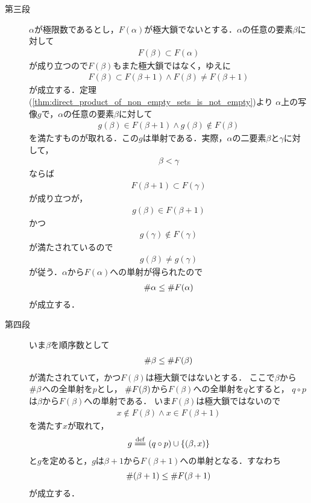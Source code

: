 \begin{sketch}
\begin{description}
			\item[第三段]
				$\alpha$が極限数であるとし，$F(\alpha)$が極大鎖でないとする．$\alpha$の任意の要素$\beta$に対して
				\begin{align}
					F(\beta) \subset F(\alpha)
				\end{align}
				が成り立つので$F(\beta)$もまた極大鎖ではなく，ゆえに
				\begin{align}
					F(\beta) \subset F(\beta + 1) \wedge F(\beta) \neq F(\beta + 1)
				\end{align}
				が成立する．定理(\ref{thm:direct_product_of_non_empty_sets_is_not_empty})より
				$\alpha$上の写像$g$で，$\alpha$の任意の要素$\beta$に対して
				\begin{align}
					g(\beta) \in F(\beta+1) \wedge g(\beta) \notin F(\beta)
				\end{align}
				を満たすものが取れる．この$g$は単射である．実際，$\alpha$の二要素$\beta$と$\gamma$に対して，
				\begin{align}
					\beta < \gamma
				\end{align}
				ならば
				\begin{align}
					F(\beta+1) \subset F(\gamma)
				\end{align}
				が成り立つが，
				\begin{align}
					g(\beta) \in F(\beta + 1)
				\end{align}
				かつ
				\begin{align}
					g(\gamma) \notin F(\gamma)
				\end{align}
				が満たされているので
				\begin{align}
					g(\beta) \neq g(\gamma)
				\end{align}
				が従う．$\alpha$から$F(\alpha)$への単射が得られたので
				\begin{align}
					\# \alpha \leq \# F(\alpha)
				\end{align}
				が成立する．
			
			\item[第四段]
				いま$\beta$を順序数として
				\begin{align}
					\# \beta \leq \# F(\beta)
				\end{align}
				が満たされていて，かつ$F(\beta)$は極大鎖ではないとする．
				ここで$\beta$から$\# \beta$への全単射を$p$とし，
				$\# F(\beta)$から$F(\beta)$への全単射を$q$とすると，
				$q \circ p$は$\beta$から$F(\beta)$への単射である．
				いま$F(\beta)$は極大鎖ではないので
				\begin{align}
					x \notin F(\beta) \wedge x \in F(\beta + 1)
				\end{align}
				を満たす$x$が取れて，
				\begin{align}
					g \defeq (q \circ p) \cup \{(\beta,x)\}
				\end{align}
				と$g$を定めると，$g$は$\beta+1$から$F(\beta+1)$への単射となる．すなわち
				\begin{align}
					\# (\beta+1) \leq \# F(\beta+1)
				\end{align}
				が成立する．
				\QED
		\end{description}
	\end{sketch}